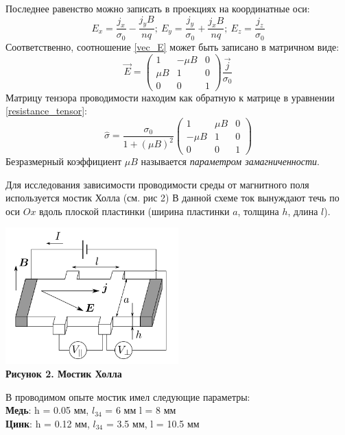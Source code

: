 \documentclass[15pt,a5paper,reqno]{article}
\begin{document}
    Последнее равенство можно записать в проекциях на координатные оси:
    \begin{equation*}
        E_x = \frac{j_x}{\sigma_0} - \frac{j_yB}{nq};\ E_y = \frac{j_y}{\sigma_0} + \frac{j_xB}{nq};\ E_z = \frac{j_z}{\sigma_0}
    \end{equation*}
    Соответственно, соотношение \eqref{vec_E} может быть записано в матричном виде:
    \begin{equation}\label{resistance_tensor}
        \vec{E} =
        \begin{pmatrix}
            1 & -\mu B & 0 \\
            \mu B & 1 & 0 \\
            0 & 0 & 1
        \end{pmatrix}
        \frac{\vec{j}}{\sigma_0}
    \end{equation}
    Матрицу тензора проводимости находим как обратную к матрице в уравнении \eqref{resistance_tensor}:
    \begin{equation}\label{conductivity_tensor}
    \boxed{\widehat{\sigma} = \frac{\sigma_0}{1 + (\mu B)^2}
            \begin{pmatrix}
                1 & \mu B & 0 \\
                -\mu B & 1 & 0 \\
                0 & 0 & 1
            \end{pmatrix}}
    \end{equation}
    Безразмерный коэффициент $\mu B$ называется \textit{параметром замагниченности}.

    Для исследования зависимости проводимости среды от магнитного поля используется мостик Холла (см. рис 2) В данной схеме ток вынуждают течь по оси $Ox$ вдоль плоской пластинки (ширина пластинки $a$, толщина $h$, длина $l$). 
    \begin{center}
        \includegraphics[width = 0.5\textwidth]{images/picture_2.png}\\
        \textbf{Рисунок 2. Мостик Холла}
    \end{center}
    В проводимом опыте мостик имел следующие параметры:\\
    \textbf{Медь}: h = 0.05 мм, $l_{34}$ = 6 мм l = 8 мм\\
    \textbf{Цинк}: h = 0.12 мм, $l_{34}$ = 3.5 мм, l = 10.5 мм\\
    
\end{document}
